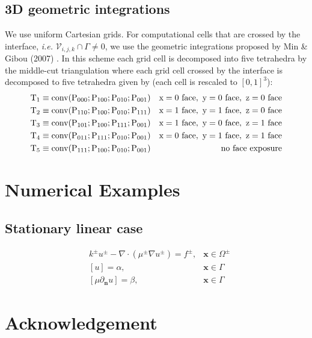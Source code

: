 \documentclass{elsarticle}
\begin{document}
\subsection{3D geometric integrations}
We use uniform Cartesian grids. For computational cells that are crossed by the interface, \textit{i.e.} $\mathcal{V}_{i,j,k}\cap \Gamma \neq 0$, we use the geometric integrations proposed by Min \& Gibou (2007) \cite{min2007geometric}. In this scheme each grid cell is decomposed into five tetrahedra by the middle-cut triangulation \cite{sallee1984middle} where each grid cell crossed by the interface is decomposed to five tetrahedra given by (each cell is rescaled to $[0,1]^3$):
\begin{align*}
        &\rm T_1 \equiv conv(P_{000} ; P_{100} ; P_{010} ; P_{001}) &\rm{ x = 0\ face,\ y = 0\ face,\ z = 0\ face} \\
        &\rm T_2 \equiv conv(P_{110} ; P_{100} ; P_{010} ; P_{111}) &\rm{ x = 1\ face,\ y = 1\ face,\ z = 0\ face} \\
        &\rm T_3 \equiv conv(P_{101} ; P_{100} ; P_{111} ; P_{001}) &\rm{ x = 1\ face,\ y = 0\ face,\ z = 1\ face} \\
        &\rm T_4 \equiv conv(P_{011} ; P_{111} ; P_{010} ; P_{001}) &\rm{ x = 0\ face,\ y = 1\ face,\ z = 1\ face} \\
        &\rm T_5\equiv conv(P_{111} ; P_{100} ; P_{010} ; P_{001}) &\rm{ no\ face\ exposure}
\end{align*}

\section{Numerical Examples}
\subsection{Stationary linear case}
\begin{align*}
&k^{\pm}u^{\pm} - \nabla \cdot (\mu^{\pm}\nabla u^\pm)=f^{\pm}, & \mathbf{x}\in\Omega^\pm\\
&[u]=\alpha, & \mathbf{x} \in \Gamma\\
&[\mu \partial_{\mathbf{n}}u]=\beta, & \mathbf{x} \in \Gamma
\end{align*}




\section*{Acknowledgement}



\newpage


\end{document}
